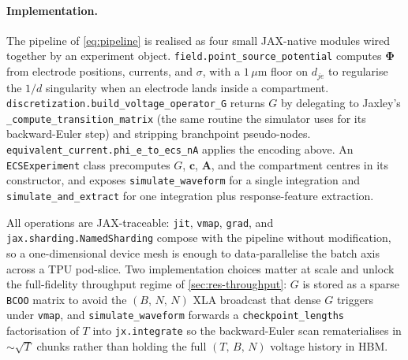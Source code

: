 \paragraph{Implementation.}
The pipeline of \cref{eq:pipeline} is realised as four small JAX-native
modules wired together by an experiment object.
\texttt{field.point\_source\_potential} computes $\boldsymbol{\Phi}$ from
electrode positions, currents, and $\sigma$, with a $1\,\mu$m floor on
$d_{je}$ to regularise the $1/d$ singularity when an electrode lands inside
a compartment.
\texttt{discretization.build\_voltage\_operator\_G} returns $G$ by
delegating to Jaxley's \texttt{\_compute\_transition\_matrix} (the same
routine the simulator uses for its backward-Euler step) and stripping
branchpoint pseudo-nodes.
\texttt{equivalent\_current.phi\_e\_to\_ecs\_nA} applies the encoding
above.
An \texttt{ECSExperiment} class precomputes $G$, $\mathbf{c}$, $\mathbf{A}$,
and the compartment centres in its constructor, and exposes
\texttt{simulate\_waveform} for a single integration and
\texttt{simulate\_and\_extract} for one integration plus response-feature
extraction.

All operations are JAX-traceable: \texttt{jit}, \texttt{vmap},
\texttt{grad}, and \texttt{jax.sharding.NamedSharding} compose with
the pipeline without modification, so a one-dimensional device mesh is
enough to data-parallelise the batch axis across a TPU pod-slice. Two
implementation choices matter at scale and unlock the full-fidelity
throughput regime of \cref{sec:res-throughput}: $G$ is stored as a
sparse \texttt{BCOO} matrix to avoid the $(B,\,N,\,N)$ XLA broadcast
that dense $G$ triggers under \texttt{vmap}, and
\texttt{simulate\_waveform} forwards a \texttt{checkpoint\_lengths}
factorisation of $T$ into \texttt{jx.integrate} so the backward-Euler
scan rematerialises in $\sim\!\sqrt{T}$ chunks rather than holding the
full $(T,\,B,\,N)$ voltage history in HBM.

